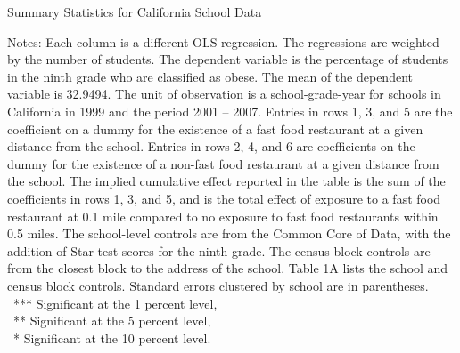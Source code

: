 \documentclass[11pt]{article}
\begin{document}
\begin{table}[H]
\caption{\label{fig: sum_stats} Summary Statistics for California School Data}
\vspace{-0.3cm}

\begin{center}\small


\end{center}
\vspace{-0.3cm}
\par
\begin{minipage}{ \linewidth}
\scriptsize{Notes: Each column is a different OLS regression. The regressions are weighted by the number of students. The
dependent variable is the percentage of students in the ninth grade who are classified as obese. The mean of the
dependent variable is 32.9494. The unit of observation is a school-grade-year for schools in California in 1999 and
the period 2001 -- 2007. Entries in rows 1, 3, and 5 are the coefficient on a dummy for the existence of a fast food
restaurant at a given distance from the school. Entries in rows 2, 4, and 6 are coefficients on the dummy for the existence
of a non-fast food restaurant at a given distance from the school. The implied cumulative effect reported in the
table is the sum of the coefficients in rows 1, 3, and 5, and is the total effect of exposure to a fast food restaurant at
0.1 mile compared to no exposure to fast food restaurants within 0.5 miles. The school-level controls are from the
Common Core of Data, with the addition of Star test scores for the ninth grade. The census block controls are from
the closest block to the address of the school. Table 1A lists the school and census block controls. Standard errors
clustered by school are in parentheses. \\\
 *** Significant at the 1 percent level,\\\
  ** Significant at the 5 percent level, \\\
  * Significant at the 10 percent level.}
\end{minipage}

\end{table}
\end{document}
